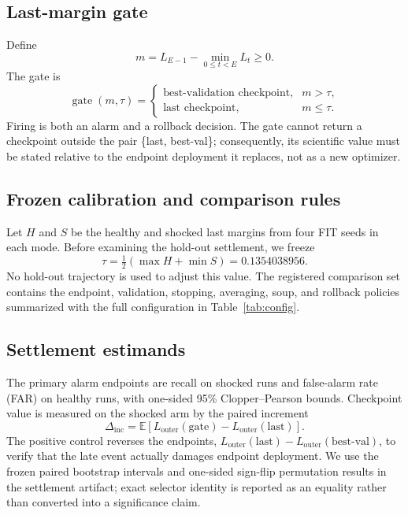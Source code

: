\documentclass{article} %
\theoremstyle{remark}
\begin{document}
\subsection{Last-margin gate}
\label{sec:gate}

Define
\begin{equation}
 m=L_{E-1}-\min_{0\leq t<E}L_t\geq0.
\end{equation}
The gate is
\begin{equation}
\label{eq:gate}
\operatorname{gate}(m,\tau)=
\begin{cases}
\text{best-validation checkpoint}, & m>\tau,\\
\text{last checkpoint}, & m\leq\tau.
\end{cases}
\end{equation}
Firing is both an alarm and a rollback decision. The gate cannot return a checkpoint outside the
pair \{last, best-val\}; consequently, its scientific value must be stated relative to the endpoint
deployment it replaces, not as a new optimizer.

\subsection{Frozen calibration and comparison rules}
\label{sec:calibration}

Let $H$ and $S$ be the healthy and shocked last margins from four FIT seeds in each mode. Before
examining the hold-out settlement, we freeze
\begin{equation}
 \tau=\tfrac12\left(\max H+\min S\right)=0.1354038956.
\end{equation}
No hold-out trajectory is used to adjust this value. The registered comparison set contains the
endpoint, validation, stopping, averaging, soup, and rollback policies summarized with the full
configuration in Table~\ref{tab:config}.

\subsection{Settlement estimands}
\label{sec:settlement}

The primary alarm endpoints are recall on shocked runs and false-alarm rate (FAR) on healthy runs,
with one-sided 95\% Clopper--Pearson bounds. Checkpoint value is measured on the shocked arm by the
paired increment
\begin{equation}
 \Delta_{\mathrm{inc}}=
 \mathbb{E}\left[L_{\mathrm{outer}}(\mathrm{gate})-
 L_{\mathrm{outer}}(\mathrm{last})\right].
\end{equation}
The positive control reverses the endpoints,
$L_{\mathrm{outer}}(\mathrm{last})-L_{\mathrm{outer}}(\mathrm{best\text{-}val})$, to verify that
the late event actually damages endpoint deployment. We use the frozen paired bootstrap intervals
and one-sided sign-flip permutation results in the settlement artifact; exact selector identity is
reported as an equality rather than converted into a significance claim.
\end{document}
